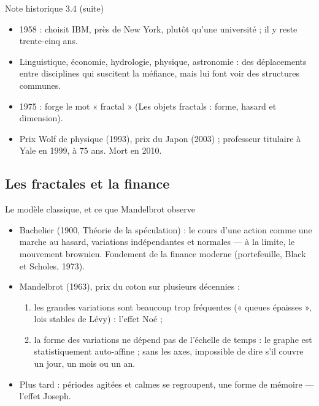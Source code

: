 \begin{frame}{Note historique 3.4 (suite)}
  \small
  \begin{itemize}
    \item 1958 : choisit IBM, près de New York, plutôt qu'une université ;
      il y reste trente-cinq ans.
    \item Linguistique, économie, hydrologie, physique, astronomie : des
      déplacements entre disciplines qui suscitent la méfiance, mais lui
      font voir des structures communes.
    \item 1975 : forge le mot « fractal » (Les objets fractals : forme,
      hasard et dimension).
    \item Prix Wolf de physique (1993), prix du Japon (2003) ; professeur
      titulaire à Yale en 1999, à $75$ ans. Mort en 2010.
  \end{itemize}
\end{frame}

\subsection{Les fractales et la finance}

\begin{frame}{Le modèle classique, et ce que Mandelbrot observe}
  \small
  \begin{itemize}
    \item Bachelier (1900, Théorie de la spéculation) : le cours d'une
      action comme une marche au hasard, variations indépendantes et
      normales --- à la limite, le mouvement brownien. Fondement de la
      finance moderne (portefeuille, Black et Scholes, 1973).
    \item Mandelbrot (1963), prix du coton sur plusieurs décennies :
      \begin{enumerate}
        \item les grandes variations sont beaucoup trop fréquentes
          (« queues épaisses », lois stables de Lévy) : l'effet Noé ;
        \item la forme des variations ne dépend pas de l'échelle de
          temps : le graphe est statistiquement auto-affine ; sans les
          axes, impossible de dire s'il couvre un jour, un mois ou un an.
      \end{enumerate}
    \item Plus tard : périodes agitées et calmes se regroupent, une
      forme de mémoire --- l'effet Joseph.
  \end{itemize}
\end{frame}

